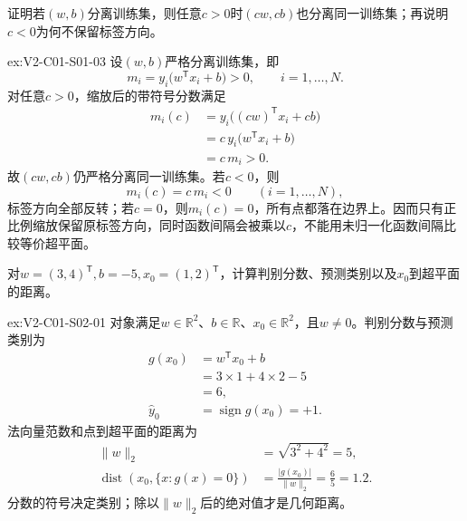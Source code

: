 \begin{SLChapterExercisePairSection}
\begin{exercise}\label{ex:V2-C01-S01-03}
证明若$(w,b)$分离训练集，则任意$c>0$时$(cw,cb)$也分离同一训练集；再说明$c<0$为何不保留标签方向。
\end{exercise}
\ifSLFullEdition
{}\label{sol:V2-C01-S01-03}
\begin{chapterexercisesolution}{ex:V2-C01-S01-03}
设$(w,b)$严格分离训练集，即
\[
m_i=y_i\bigl(w^{\mathsf T}x_i+b\bigr)>0,
\qquad i=1,\ldots,N.
\]
对任意$c>0$，缩放后的带符号分数满足
\[
\begin{aligned}
m_i(c)
&=y_i\bigl((cw)^{\mathsf T}x_i+cb\bigr)\\
&=c\,y_i\bigl(w^{\mathsf T}x_i+b\bigr)\\
&=c\,m_i>0.
\end{aligned}
\]
故$(cw,cb)$仍严格分离同一训练集。若$c<0$，则
\[
m_i(c)=c\,m_i<0\qquad(i=1,\ldots,N),
\]
标签方向全部反转；若$c=0$，则$m_i(c)=0$，所有点都落在边界上。因而只有正比例缩放保留原标签方向，同时函数间隔会被乘以$c$，不能用未归一化函数间隔比较等价超平面。
\end{chapterexercisesolution}
\fi

\begin{exercise}\label{ex:V2-C01-S02-01}
对$w=(3,4)^{\mathsf T},b=-5,x_0=(1,2)^{\mathsf T}$，计算判别分数、预测类别以及$x_0$到超平面的距离。
\end{exercise}
\ifSLFullEdition
{}\label{sol:V2-C01-S02-01}
\begin{chapterexercisesolution}{ex:V2-C01-S02-01}
对象满足$w\in\mathbb R^2$、$b\in\mathbb R$、$x_0\in\mathbb R^2$，且$w\neq0$。判别分数与预测类别为
\[
\begin{aligned}
g(x_0)
&=w^{\mathsf T}x_0+b\\
&=3\times1+4\times2-5\\
&=6,\\
\widehat y_0&=\operatorname{sign}g(x_0)=+1.
\end{aligned}
\]
法向量范数和点到超平面的距离为
\[
\begin{aligned}
\lVert w\rVert_2&=\sqrt{3^2+4^2}=5,\\
\operatorname{dist}(x_0,\{x:g(x)=0\})
&=\frac{|g(x_0)|}{\lVert w\rVert_2}
=\frac65=1.2.
\end{aligned}
\]
分数的符号决定类别；除以$\lVert w\rVert_2$后的绝对值才是几何距离。
\end{chapterexercisesolution}
\fi


\end{SLChapterExercisePairSection}
